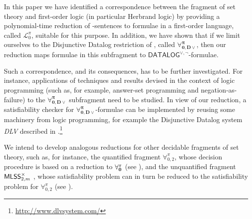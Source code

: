 \documentclass[a4paper]{llncs}
\newcommand{\DisjDatalog}{\ensuremath{\mathsf{DATALOG}^{\vee,\neg}}\xspace}
\newcommand{\ForallpizeroDisjDatalog}{\ensuremath{\mathbf{\forall_{0,D\vee}^{\pi}}}\xspace}
\newcommand{\Elpizero}{\ensuremath{\mathcal{L}_{0}^{\pi}}\xspace}
\begin{document}
In this paper we have identified a correspondence between the fragment
of set theory \Forallpizero and first-order logic (in particular
Herbrand logic) by providing a polynomial-time reduction of
\Forallpizero-sentences to formulae in a first-order language, called
\Elpizero, suitable for this purpose.  In addition, we have shown that
if we limit ourselves to the Disjunctive Datalog restriction of
\Forallpizero, called \ForallpizeroDisjDatalog, then our reduction maps
formulae in this subfragment to \DisjDatalog-formulae.

Such a correspondence, and its consequences, has to be further
investigated.  For instance, applications of techniques and results
devised in the context of logic programming (such as, for example,
answer-set programming and negation-as-failure) to the
\ForallpizeroDisjDatalog subfragment need to be studied.  In view of
our reduction, a satisfiability checker for
\ForallpizeroDisjDatalog-formulae can be implemented by reusing some
machinery from logic programming, for example the Disjunctive Datalog
system \emph{DLV} described in
\cite{AlvFabLeoPerPfeTer2011}.\footnote{\url{http://www.dlvsystem.com/}}

We intend to develop analogous reductions for other decidable
fragments of set theory, such as, for instance, the quantified
fragment $\forall_{0,2}^{\pi}$, whose decision procedure is based on 
a reduction to $\mathbf{\forall_{0}^{\pi}}$ (see \cite{CanLon2012}), and the
unquantified fragment $\mathsf{MLSS}_{2,m}^{\times}$ , whose
satisfiability problem can in turn be reduced to the satisfiability
problem for $\forall_{0,2}^{\pi}$ (see \cite{CanLonNic2010}).





\end{document}

